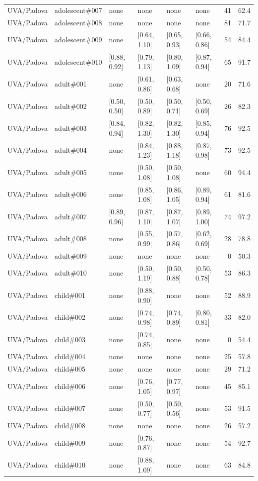 \begin{table}[H]
\begin{tabular}{llllllrr}
UVA/Padova & adolescent\#007 & none & none & none & none & 41 & 62.4 \\
UVA/Padova & adolescent\#008 & none & none & none & none & 81 & 71.7 \\
UVA/Padova & adolescent\#009 & none & [0.64, 1.10] & [0.65, 0.93] & [0.66, 0.86] & 54 & 84.4 \\
UVA/Padova & adolescent\#010 & [0.88, 0.92] & [0.79, 1.13] & [0.80, 1.09] & [0.87, 0.94] & 65 & 91.7 \\
UVA/Padova & adult\#001 & none & [0.61, 0.86] & [0.63, 0.68] & none & 20 & 71.6 \\
UVA/Padova & adult\#002 & [0.50, 0.50] & [0.50, 0.89] & [0.50, 0.71] & [0.50, 0.69] & 26 & 82.3 \\
UVA/Padova & adult\#003 & [0.84, 0.94] & [0.82, 1.30] & [0.82, 1.30] & [0.85, 0.94] & 76 & 92.5 \\
UVA/Padova & adult\#004 & none & [0.84, 1.23] & [0.88, 1.18] & [0.87, 0.98] & 73 & 92.5 \\
UVA/Padova & adult\#005 & none & [0.50, 1.08] & [0.50, 1.08] & none & 60 & 94.4 \\
UVA/Padova & adult\#006 & none & [0.85, 1.08] & [0.86, 1.05] & [0.89, 0.94] & 61 & 81.6 \\
UVA/Padova & adult\#007 & [0.89, 0.96] & [0.87, 1.10] & [0.87, 1.07] & [0.89, 1.00] & 74 & 97.2 \\
UVA/Padova & adult\#008 & none & [0.55, 0.99] & [0.57, 0.86] & [0.62, 0.69] & 28 & 78.8 \\
UVA/Padova & adult\#009 & none & none & none & none & 0 & 50.3 \\
UVA/Padova & adult\#010 & none & [0.50, 1.19] & [0.50, 0.88] & [0.50, 0.78] & 53 & 86.3 \\
UVA/Padova & child\#001 & none & [0.88, 0.90] & none & none & 52 & 88.9 \\
UVA/Padova & child\#002 & none & [0.74, 0.98] & [0.74, 0.89] & [0.80, 0.81] & 33 & 82.0 \\
UVA/Padova & child\#003 & none & [0.74, 0.85] & none & none & 0 & 54.4 \\
UVA/Padova & child\#004 & none & none & none & none & 25 & 57.8 \\
UVA/Padova & child\#005 & none & none & none & none & 29 & 71.2 \\
UVA/Padova & child\#006 & none & [0.76, 1.05] & [0.77, 0.97] & none & 45 & 85.1 \\
UVA/Padova & child\#007 & none & [0.50, 0.77] & [0.50, 0.56] & none & 53 & 91.5 \\
UVA/Padova & child\#008 & none & none & none & none & 26 & 57.2 \\
UVA/Padova & child\#009 & none & [0.76, 0.87] & none & none & 54 & 92.7 \\
UVA/Padova & child\#010 & none & [0.88, 1.09] & none & none & 63 & 84.8 \\
\bottomrule
\end{tabular}
\end{table}


